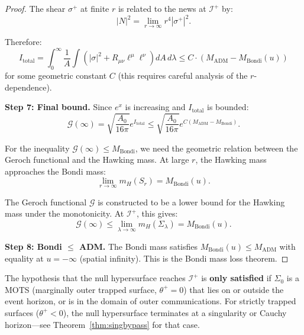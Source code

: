\begin{proof}
The shear $\sigma^+$ at finite $r$ is related to the news at $\mathscr{I}^+$ by:
\begin{equation}
    |N|^2 = \lim_{r \to \infty} r^4 |\sigma^+|^2.
\end{equation}

Therefore:
\begin{equation}
    I_{\text{total}} = \int_0^\infty \frac{1}{A}\int(|\sigma|^2 + R_{\mu\nu}\ell^\mu\ell^\nu) dA \, d\lambda \leq C \cdot (M_{\mathrm{ADM}} - M_{\mathrm{Bondi}}(u))
\end{equation}
for some geometric constant $C$ (this requires careful analysis of the $r$-dependence).

\textbf{Step 7: Final bound.}
Since $e^x$ is increasing and $I_{\text{total}}$ is bounded:
\begin{equation}
    \mathcal{G}(\infty) = \sqrt{\frac{A_0}{16\pi}} e^{I_{\text{total}}} \leq \sqrt{\frac{A_0}{16\pi}} e^{C(M_{\mathrm{ADM}} - M_{\mathrm{Bondi}})}.
\end{equation}

For the inequality $\mathcal{G}(\infty) \leq M_{\mathrm{Bondi}}$, we need the geometric relation between the Geroch functional and the Hawking mass. At large $r$, the Hawking mass approaches the Bondi mass:
\begin{equation}
    \lim_{r \to \infty} m_H(S_r) = M_{\mathrm{Bondi}}(u).
\end{equation}

The Geroch functional $\mathcal{G}$ is constructed to be a lower bound for the Hawking mass under the monotonicity. At $\mathscr{I}^+$, this gives:
\begin{equation}
    \mathcal{G}(\infty) \leq \lim_{\lambda \to \infty} m_H(\Sigma_\lambda) = M_{\mathrm{Bondi}}(u).
\end{equation}

\textbf{Step 8: Bondi $\leq$ ADM.}
The Bondi mass satisfies $M_{\mathrm{Bondi}}(u) \leq M_{\mathrm{ADM}}$ with equality at $u = -\infty$ (spatial infinity). This is the Bondi mass loss theorem.
\end{proof}

\begin{remark}\label{rmk:MOTSassumption}
The hypothesis that the null hypersurface reaches $\mathscr{I}^+$ is \textbf{only satisfied} if $\Sigma_0$ is a MOTS (marginally outer trapped surface, $\theta^+ = 0$) that lies on or outside the event horizon, or is in the domain of outer communications. For strictly trapped surfaces ($\theta^+ < 0$), the null hypersurface terminates at a singularity or Cauchy horizon---see Theorem~\ref{thm:singbypass} for that case.
\end{remark}

